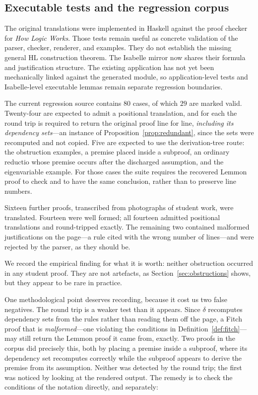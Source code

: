 \documentclass[11pt]{article}
\theoremstyle{plain}
\theoremstyle{definition}
\theoremstyle{remark}
\begin{document}
\subsection{Executable tests and the regression corpus}

The original translations were implemented in Haskell against the proof
checker for \emph{How Logic Works}. Those tests remain useful as concrete
validation of the parser, checker, renderer, and examples. They do not
establish the missing general HL construction theorem. The
Isabelle mirror now shares their formula and justification structure. The
existing application has not yet been mechanically linked against the
generated module, so application-level tests and Isabelle-level executable
lemmas remain separate regression boundaries.

The current regression source contains $80$ cases, of which $29$ are marked
valid. Twenty-four are expected to admit a positional translation, and for
each the round trip is required to return the original proof line for line,
\emph{including its dependency sets}---an instance of
Proposition~\ref{prop:redundant}, since the sets were recomputed and not
copied. Five are expected to use the derivation-tree route: the obstruction
examples, a premise placed inside a subproof, an ordinary reductio whose
premise occurs after the discharged assumption, and the eigenvariable example.
For those cases the suite requires the recovered Lemmon proof to check and to
have the same conclusion, rather than to preserve line numbers.

Sixteen further proofs, transcribed from photographs of student work, were
translated. Fourteen were well formed; all fourteen admitted positional
translations and round-tripped exactly. The remaining two contained malformed
justifications on the page---a rule cited with the wrong number of
lines---and were rejected by the parser, as they should be.

We record the empirical finding for what it is worth: neither obstruction
occurred in any student proof. They are not artefacts, as
Section~\ref{sec:obstructions} shows, but they appear to be rare in practice.

One methodological point deserves recording, because it cost us two false
negatives. The round trip is a weaker test than it appears. Since $\delta$
recomputes dependency sets from the rules rather than reading them off the
page, a Fitch proof that is \emph{malformed}---one violating the conditions in
Definition~\ref{def:fitch}---may still return the Lemmon proof it came from,
exactly. Two proofs in the corpus did precisely this, both by placing a
premise inside a subproof, where its dependency set recomputes correctly while
the subproof appears to derive the premise from its assumption. Neither was
detected by the round trip; the first was noticed by looking at the rendered
output. The remedy is to check the conditions of the notation directly, and
separately:
\end{document}
